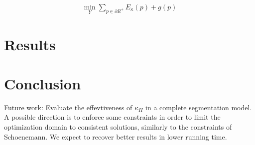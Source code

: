\documentclass[runningheads]{llncs}
\begin{document}
	\begin{align}
		\min_{Y} \sum_{p \in \partial R^+}E_{\kappa}(p) + g(p)
		\label{eq:optimization_problem_no_conn}
	\end{align}
	
	

\section{Results}

\section{Conclusion}

Future work: Evaluate the effevtiveness of $\kappa_{II}$ in a complete segmentation model. A possible direction is to enforce some constraints in order to limit the optimization domain to consistent solutions, similarly to the constraints of Schoenemann. We expect to recover better results in lower running time.


%
%
%


\end{document}
